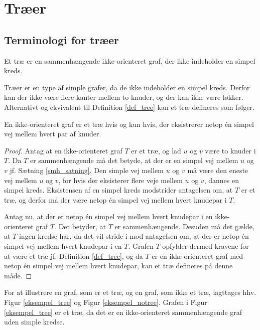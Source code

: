 \section{Træer}
\subsection{Terminologi for træer}

\begin{defn}
Et træ er en sammenhængende ikke-orienteret graf, der ikke indeholder en simpel kreds.
\label{def_tree}
\end{defn}

\noindent Træer er en type af simple grafer, da de ikke indeholder en simpel kreds. Derfor kan der ikke være flere kanter mellem to knuder, og der kan ikke være løkker. Alternativt og ekvivalent til Definition \ref{def_tree} kan et træ defineres som følger.

\begin{thm}
En ikke-orienteret graf er et træ hvis og kun hvis, der eksistrerer netop én simpel vej mellem hvert par af knuder. 
\end{thm}

\begin{proof}
Antag at en ikke-orienteret graf $T$ er et træ, og lad $u$ og $v$ være to knuder i $T$. Da $T$ er sammenhængende må det betyde, at der er en simpel vej mellem $u$ og $v$ jf. Sætning \ref{smh_satning}. Den simple vej mellem $u$ og $v$ må være den eneste vej mellem $u$ og $v$, for hvis der eksisterer flere veje mellem $u$ og $v$, dannes en simpel kreds. Eksistensen af en simpel kreds modstrider antagelsen om, at $T$ er et træ, og derfor må der være netop én simpel vej mellem hvert knudepar i $T$.

Antag nu, at der er netop én simpel vej mellem hvert knudepar i en ikke-orienteret graf $T$. Det betyder, at $T$ er sammenhængende. Desuden må det gælde, at $T$ ingen kredse har, da det vil stride i mod antagelsen om, at der er netop én simpel vej mellem hvert knudepar i en $T$. Grafen $T$ opfylder dermed kravene for at være et træ jf. Definition \ref{def_tree}, og da $T$ er en ikke-orienteret graf med netop én simpel vej mellem hvert knudepar, kan et træ defineres på denne måde.
\end{proof}

\begin{exmp}
For at illustrere en graf, som er et træ, og en graf, som ikke et træ, iagttages hhv. Figur \ref{eksempel_tree} og Figur \ref{eksempel_notree}. Grafen i Figur \ref{eksempel_tree} er et træ, da det er en ikke-orienteret sammenhængende graf uden simple kredse.
\end{exmp}

